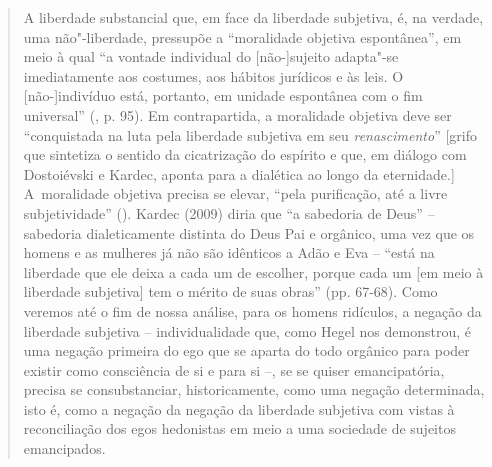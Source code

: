 {\begin{quote}
A liberdade substancial que, em face da liberdade subjetiva, é, na
verdade, uma não"-liberdade, pressupõe a ``moralidade objetiva
espontânea'', em meio à qual ``a vontade individual do {[}não-{]}sujeito
adapta"-se imediatamente aos costumes, aos hábitos jurídicos e às leis. O
{[}não-{]}indivíduo está, portanto, em unidade espontânea com o fim
universal'' (, p. 95). Em contrapartida, a moralidade objetiva deve
ser ``conquistada na luta pela liberdade subjetiva em seu
\emph{renascimento}'' {[}grifo que sintetiza o sentido da cicatrização
do espírito e que, em diálogo com Dostoiévski e Kardec, aponta para a
dialética ao longo da eternidade.{]} A~moralidade objetiva precisa se
elevar, ``pela purificação, até a livre subjetividade'' (). Kardec
(2009) diria que ``a sabedoria de Deus'' -- sabedoria dialeticamente
distinta do Deus Pai e orgânico, uma vez que os homens e as mulheres já
não são idênticos a Adão e Eva -- ``está na liberdade que ele deixa a
cada um de escolher, porque cada um {[}em meio à liberdade subjetiva{]}
tem o mérito de suas obras'' (pp. 67-68). Como veremos até o fim de
nossa análise, para os homens ridículos, a negação da liberdade
subjetiva -- individualidade que, como Hegel nos demonstrou, é uma
negação primeira do ego que se aparta do todo orgânico para poder
existir como consciência de si e para si --, se se quiser emancipatória,
precisa se consubstanciar, historicamente, como uma negação determinada,
isto é, como a negação da negação da liberdade subjetiva com vistas à
reconciliação dos egos hedonistas em meio a uma sociedade de sujeitos
emancipados.


\end{quote}}
